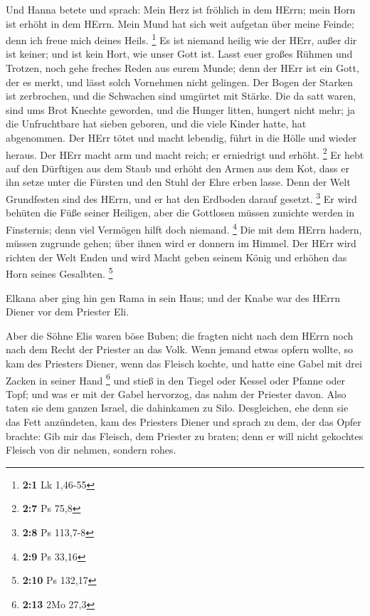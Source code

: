  Und Hanna betete und sprach: Mein Herz ist fröhlich in dem
HErrn; mein Horn ist erhöht in dem HErrn. Mein Mund hat sich weit
aufgetan über meine Feinde; denn ich freue mich deines Heils.
\footnote{\textbf{2:1} Lk 1,46-55}  Es ist niemand heilig
wie der HErr, außer dir ist keiner; und ist kein Hort, wie unser Gott
ist.  Lasst euer großes Rühmen und Trotzen, noch gehe
freches Reden aus eurem Munde; denn der HErr ist ein Gott, der es merkt,
und lässt solch Vornehmen nicht gelingen.  Der Bogen der
Starken ist zerbrochen, und die Schwachen sind umgürtet mit Stärke.
 Die da satt waren, sind ums Brot Knechte geworden, und die
Hunger litten, hungert nicht mehr; ja die Unfruchtbare hat sieben
geboren, und die viele Kinder hatte, hat abgenommen.  Der
HErr tötet und macht lebendig, führt in die Hölle und wieder heraus.
 Der HErr macht arm und macht reich; er erniedrigt und
erhöht. \footnote{\textbf{2:7} Ps 75,8}  Er hebt auf den
Dürftigen aus dem Staub und erhöht den Armen aus dem Kot, dass er ihn
setze unter die Fürsten und den Stuhl der Ehre erben lasse. Denn der
Welt Grundfesten sind des HErrn, und er hat den Erdboden darauf gesetzt.
\footnote{\textbf{2:8} Ps 113,7-8}  Er wird behüten die Füße
seiner Heiligen, aber die Gottlosen müssen zunichte werden in
Finsternis; denn viel Vermögen hilft doch niemand. \footnote{\textbf{2:9}
  Ps 33,16}  Die mit dem HErrn hadern, müssen zugrunde
gehen; über ihnen wird er donnern im Himmel. Der HErr wird richten der
Welt Enden und wird Macht geben seinem König und erhöhen das Horn seines
Gesalbten. \footnote{\textbf{2:10} Ps 132,17}

 Elkana aber ging hin gen Rama in sein Haus; und der Knabe
war des HErrn Diener vor dem Priester Eli.

 Aber die Söhne Elis waren böse Buben; die fragten nicht
nach dem HErrn  noch nach dem Recht der Priester an das
Volk. Wenn jemand etwas opfern wollte, so kam des Priesters Diener, wenn
das Fleisch kochte, und hatte eine Gabel mit drei Zacken in seiner Hand
\footnote{\textbf{2:13} 2Mo 27,3}  und stieß in den Tiegel
oder Kessel oder Pfanne oder Topf; und was er mit der Gabel hervorzog,
das nahm der Priester davon. Also taten sie dem ganzen Israel, die
dahinkamen zu Silo.  Desgleichen, ehe denn sie das Fett
anzündeten, kam des Priesters Diener und sprach zu dem, der das Opfer
brachte: Gib mir das Fleisch, dem Priester zu braten; denn er will nicht
gekochtes Fleisch von dir nehmen, sondern rohes.

